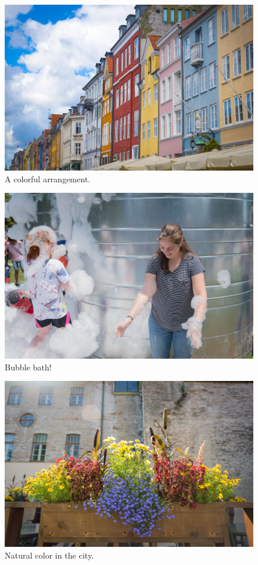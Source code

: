 \documentclass{report}
\begin{document}
\begin{figure}
  \includegraphics[width=\linewidth]{res/colorfulwalls.jpg}
  \caption{A colorful arrangement.}
\end{figure}

\begin{figure}
  \includegraphics[width=\linewidth]{res/bubblebath.jpg}
  \caption{Bubble bath!}
\end{figure}

\begin{figure}
  \includegraphics[width=\linewidth]{res/flowerpot.jpg}
  \caption{Natural color in the city.}
\end{figure}
\end{document}
